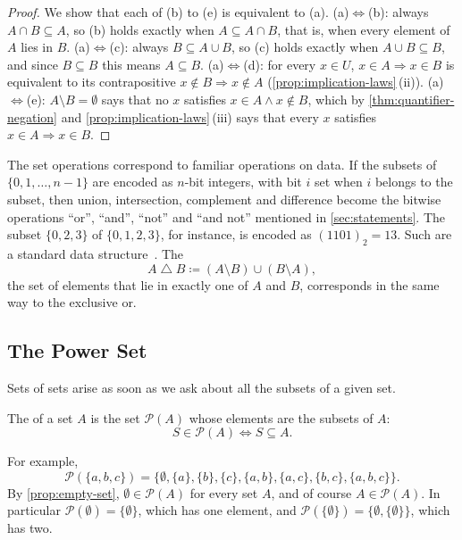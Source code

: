 \begin{proof}
We show that each of (b) to (e) is equivalent to (a). (a)$\Leftrightarrow$(b): always $A\cap B\subseteq A$, so (b) holds exactly when $A\subseteq A\cap B$, that is, when every element of $A$ lies in $B$. (a)$\Leftrightarrow$(c): always $B\subseteq A\cup B$, so (c) holds exactly when $A\cup B\subseteq B$, and since $B\subseteq B$ this means $A\subseteq B$. (a)$\Leftrightarrow$(d): for every $x\in U$, $x\in A\Rightarrow x\in B$ is equivalent to its contrapositive $x\notin B\Rightarrow x\notin A$ (\cref{prop:implication-laws}\,(ii)). (a)$\Leftrightarrow$(e): $A\setminus B=\emptyset$ says that no $x$ satisfies $x\in A\wedge x\notin B$, which by \cref{thm:quantifier-negation} and \cref{prop:implication-laws}\,(iii) says that every $x$ satisfies $x\in A\Rightarrow x\in B$.
\end{proof}

The set operations correspond to familiar operations on data. If the subsets of $\{0,1,\ldots,n-1\}$ are encoded as $n$-bit integers, with bit $i$ set when $i$ belongs to the subset, then union, intersection, complement and difference become the bitwise operations ``or'', ``and'', ``not'' and ``and not'' mentioned in \cref{sec:statements}. The subset $\{0,2,3\}$ of $\{0,1,2,3\}$, for instance, is encoded as $(1101)_2=13$. Such  are a standard data structure~\cite[Sect.~7.1.3]{knuth2011taocp4a}. The 
\[
A\mathbin{\triangle}B\coloneqq(A\setminus B)\cup(B\setminus A),
\]
the set of elements that lie in exactly one of $A$ and $B$, corresponds in the same way to the exclusive or.

\subsection{The Power Set}

Sets of sets arise as soon as we ask about all the subsets of a given set.

\begin{definition}
\label{def:power-set}
The  of a set $A$ is the set $\mathcal P(A)$ whose elements are the subsets of $A$:
\[
S\in\mathcal P(A)\iff S\subseteq A .
\]
\end{definition}

For example,
\[
\mathcal P(\{a,b,c\})=\bigl\{\emptyset,\{a\},\{b\},\{c\},\{a,b\},\{a,c\},\{b,c\},\{a,b,c\}\bigr\}.
\]
By \cref{prop:empty-set}, $\emptyset\in\mathcal P(A)$ for every set $A$, and of course $A\in\mathcal P(A)$. In particular $\mathcal P(\emptyset)=\{\emptyset\}$, which has one element, and $\mathcal P(\{\emptyset\})=\{\emptyset,\{\emptyset\}\}$, which has two.

